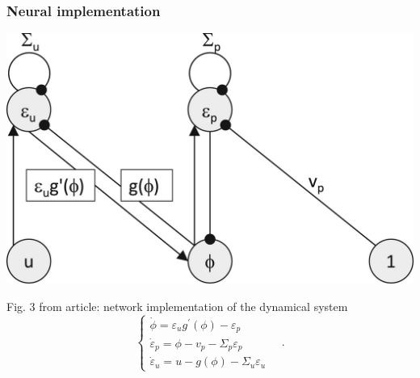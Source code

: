 \documentclass[aspectratio=43]{beamer}
\begin{document}
\begin{frame}
  \frametitle{Neural implementation}
  \begin{center}
    \includegraphics[width=0.5\textheight]{Fig3}
  \end{center}
  Fig. 3 from article: network implementation of the dynamical system
  \begin{equation}
    \label{eq:dynamical_system_single}
    \begin{cases}
      \dot{\phi} = \varepsilon_u g^\prime(\phi) - \varepsilon_p \\
      \dot{\varepsilon}_p = \phi - v_p - \Sigma_p \varepsilon_p \\
      \dot{\varepsilon}_u = u - g(\phi) - \Sigma_u \varepsilon_u
    \end{cases}
    \quad .
  \end{equation}
\end{frame}
\end{document}
